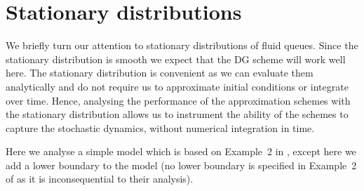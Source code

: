 \FloatBarrier
\section{Stationary distributions} \label{sec:stat}
We briefly turn our attention to stationary distributions of fluid queues. Since the stationary distribution is smooth we expect that the DG scheme will work well here. The stationary distribution is convenient as we can evaluate them analytically \cite{s2017} and do not require us to approximate initial conditions or integrate over time. Hence, analysing the performance of the approximation schemes with the stationary distribution allows us to instrument the ability of the schemes to capture the stochastic dynamics, without numerical integration in time.

Here we analyse a simple model which is based on Example~2 in \citep{bean2009}, except here we add a lower boundary to the model (no lower boundary is specified in Example~2 of \citep{bean2009} as it is inconsequential to their analysis). 



